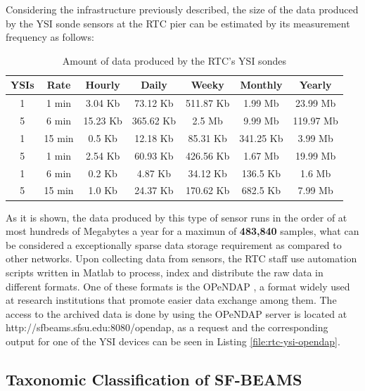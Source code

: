 Considering the infrastructure previously described, the size of the data
produced by the YSI sonde sensors at the RTC pier can be estimated by its
measurement frequency as follows:

\begin{table}
    \label{tab:ysi-data-distribution}
    \caption{Amount of data produced by the RTC's YSI sondes}
        \begin{center}
        \begin{tabular}{|c|c|c|c|c|c|c|}\hline 
        \textbf{YSIs} & \textbf{Rate} & \textbf{Hourly} & \textbf{Daily} &
        \textbf{Weeky} & \textbf{Monthly} & \textbf{Yearly}\\\hline 
        1 & 1 min & 3.04 Kb & 73.12 Kb & 511.87 Kb & 1.99 Mb & 23.99 Mb\\\hline 
        5 & 6 min & 15.23 Kb & 365.62 Kb & 2.5 Mb & 9.99 Mb & 119.97 Mb\\\hline 
        1 & 15 min & 0.5 Kb & 12.18 Kb & 85.31 Kb & 341.25 Kb & 3.99 Mb\\\hline 
        5 & 1 min & 2.54 Kb & 60.93 Kb & 426.56 Kb & 1.67 Mb & 19.99 Mb\\\hline
        1 & 6 min & 0.2 Kb & 4.87 Kb & 34.12 Kb & 136.5 Kb & 1.6 Mb\\\hline 
        5 & 15 min & 1.0 Kb & 24.37 Kb & 170.62 Kb & 682.5 Kb & 7.99 Mb\\\hline
        \end{tabular}
        \end{center}
\end{table}

As it is shown, the data produced by this type of sensor runs in the order of
at most hundreds of Megabytes a year for a maximun of \textbf{483,840}
samples, what can be considered a exceptionally sparse data storage
requirement as compared to other networks. Upon collecting data from sensors,
the RTC staff use automation scripts written in Matlab to process, index and
distribute the raw data in different formats. One of these formats is the
OPeNDAP \cite{opendap}, a format widely used at research institutions that
promote easier data exchange among them. The access to the archived data is
done by using the OPeNDAP server is located at
http://sfbeams.sfsu.edu:8080/opendap, as a request and the corresponding
output for one of the YSI devices can be seen in Listing \ref{file:rtc-ysi-opendap}.

\subsection{Taxonomic Classification of SF-BEAMS}

